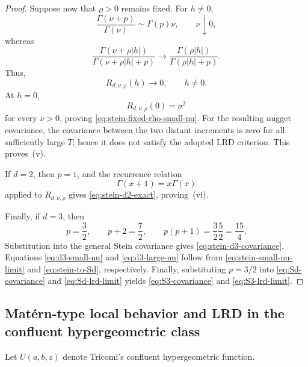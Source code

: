 \documentclass[preprint,12pt,authoryear]{elsarticle}
\begin{document}
\begin{proof}
Suppose now that \(\rho>0\) remains fixed. For \(h\neq0\),
\[
\frac{\Gamma(\nu+p)}{\Gamma(\nu)}
\sim
\Gamma(p)\nu,
\qquad \nu\downarrow0,
\]
whereas
\[
\frac{\Gamma(\nu+\rho|h|)}
{\Gamma(\nu+\rho|h|+p)}
\longrightarrow
\frac{\Gamma(\rho|h|)}
{\Gamma(\rho|h|+p)}.
\]
Thus,
\[
R_{d,\nu,\rho}(h)\longrightarrow0,
\qquad h\neq0.
\]
At \(h=0\),
\[
R_{d,\nu,\rho}(0)=\sigma^2
\]
for every \(\nu>0\), proving
\eqref{eq:stein-fixed-rho-small-nu}. For the resulting nugget
covariance, the covariance between the two distant increments is zero
for all sufficiently large \(T\); hence it does not satisfy the adopted
LRD criterion. This proves~(v).

If \(d=2\), then \(p=1\), and the recurrence relation
\[
\Gamma(x+1)=x\Gamma(x)
\]
applied to \(R_{d,\nu,\rho}\) gives
\eqref{eq:stein-d2-exact}, proving~(vi).

Finally, if \(d=3\), then
\[
p=\frac32,
\qquad
p+2=\frac72,
\qquad
p(p+1)
=
\frac32\frac52
=
\frac{15}{4}.
\]
Substitution into the general Stein covariance gives
\eqref{eq:stein-d3-covariance}. Equations
\eqref{eq:d3-small-nu} and \eqref{eq:d3-large-nu} follow from
\eqref{eq:stein-small-nu-limit} and \eqref{eq:stein-to-Sd},
respectively. Finally, substituting \(p=3/2\) into
\eqref{eq:Sd-covariance} and \eqref{eq:Sd-lrd-limit} yields
\eqref{eq:S3-covariance} and \eqref{eq:S3-lrd-limit}.
\end{proof}




\subsection{Matérn-type local behavior and LRD in the confluent
hypergeometric class}

Let \(U(a,b,z)\) denote Tricomi's confluent hypergeometric function.
\end{document}
